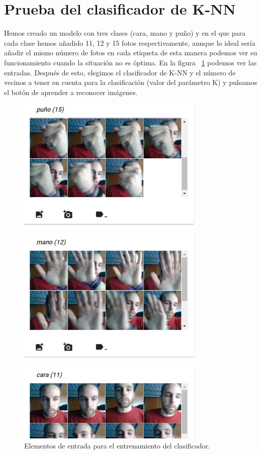 \documentclass[a4paper, 12pt]{book}
\begin{document}
\section{Prueba del clasificador de K-NN} 
\label{sec:pruebaknn}

Hemos creado un modelo con tres clases (cara, mano y puño) y en el que para cada clase hemos añadido 11, 12 y 15 fotos respectivamente, aunque lo ideal sería añadir el mismo número de fotos en cada etiqueta de esta manera podemos ver su funcionamiento cuando la situación no es óptima. En la figura ~\ref{fig:fotosentrada} podemos ver las entradas. Después de esto, elegimos el clasificador de K-NN y el número de vecinos a tener en cuenta para la clasificación (valor del parámetro K) y pulsamos el botón de aprender a reconocer imágenes.

\begin{figure}
	\centering
	\includegraphics[width=9cm, keepaspectratio]{img/fotosentrada}
	\caption{Elementos de entrada para el entrenamiento del clasificador.}			
	\label{fig:fotosentrada}
\end{figure}
\end{document}
